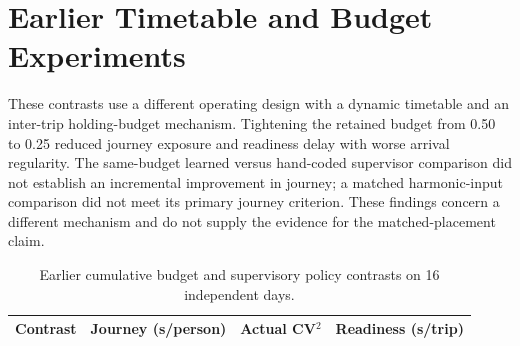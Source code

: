 \documentclass[10pt,journal,onecolumn]{IEEEtran}
\begin{document}
\section{Earlier Timetable and Budget Experiments}
These contrasts use a different operating design with a dynamic timetable
and an inter-trip holding-budget mechanism. Tightening the retained budget
from 0.50 to 0.25 reduced journey exposure and readiness delay with worse
arrival regularity. The same-budget learned versus hand-coded supervisor
comparison did not establish an incremental improvement in journey; a
matched harmonic-input comparison did not meet its primary journey
criterion. These findings concern a different mechanism and do not supply
the evidence for the matched-placement claim.

\begin{table}[!ht]
\centering
\caption{Earlier cumulative budget and supervisory policy contrasts on 16 independent days.}
\small
\begin{tabular}{@{}lrrr@{}}
\toprule
Contrast & Journey (s/person) & Actual CV$^2$ & Readiness (s/trip) \\
\midrule

\end{tabular}
\end{table}
\end{document}
